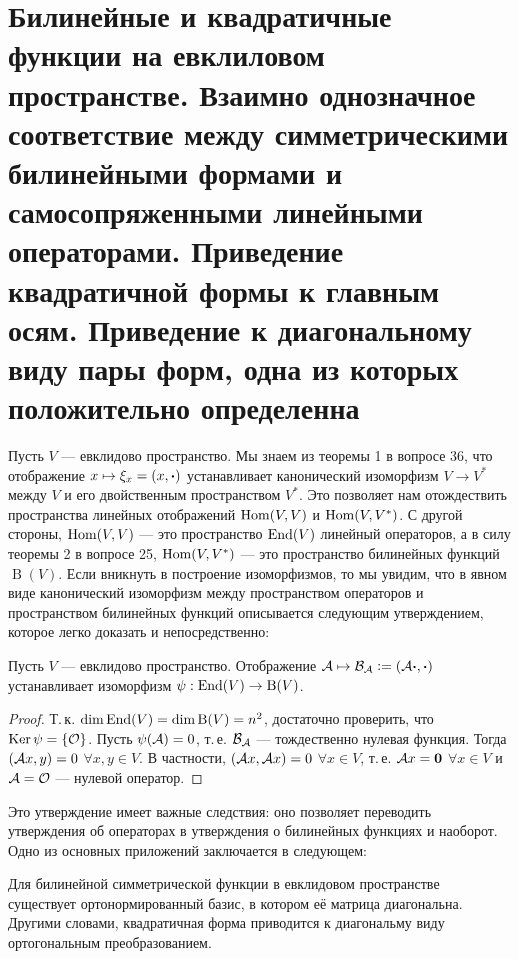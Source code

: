 \section{Билинейные и квадратичные функции на евклиловом пространстве. Взаимно однозначное
соответствие между симметрическими билинейными формами и самосопряженными
линейными операторами. Приведение квадратичной формы к главным осям. Приведение к
диагональному виду пары форм, одна из которых положительно определенна}

Пусть $V$ --- евклидово пространство. Мы знаем из теоремы 1 в вопросе 36, что отображение $x \mapsto \xi_x = (x, \boldsymbol{\cdot})$ устанавливает канонический изоморфизм $V \to V^\ast$ между $V$ и его двойственным пространством $V^\ast$. Это позволяет нам отождествить пространства линейных отображений $\operatorname{Hom}(V, V)$ и $\operatorname{Hom}(V, V^\ast)$. С другой стороны, $\operatorname{Hom}(V ,V)$ --- это пространство $\operatorname{End}(V)$ линейный операторов, а в силу теоремы 2 в вопросе 25, $\operatorname{Hom}(V, V^\ast)$ --- это пространство билинейных функций $\operatorname{B}(V)$. Если вникнуть в построение изоморфизмов, то мы увидим, что в явном виде канонический изоморфизм между пространством операторов и пространством билинейных функций описывается следующим утверждением, которое легко доказать и непосредственно:

\begin{proposal}
    Пусть $V$ --- евклидово пространство. Отображение $\mathcal{A} \mapsto \mathcal{B}_{\mathcal{A}} \vcentcolon = (\mathcal{A}\boldsymbol{\cdot}, \boldsymbol{\cdot})$ устанавливает изоморфизм $\psi: \operatorname{End}(V) \to \operatorname{B}(V)$.
\end{proposal}

\begin{proof}
    Т.\,к. $\dim\operatorname{End}(V) = \dim\operatorname{B}(V) = n^2$, достаточно проверить, что $\operatorname{Ker}\psi = \{\mathcal{O}\}$. Пусть $\psi(\mathcal{A}) = 0$, т.\,е. $\mathcal{B}_{\mathcal{A}}$ --- тождественно нулевая функция. Тогда $(\mathcal{A} x, y) = 0$ $\forall x, y \in V$. В частности, $(\mathcal{A} x, \mathcal{A} x) = 0$ $\forall x \in V$, т.\,е. $\mathcal{A} x = \boldsymbol{0}$ $\forall x \in V$ и $\mathcal{A} = \mathcal{O}$ --- нулевой оператор.
\end{proof}

Это утверждение имеет важные следствия: оно позволяет переводить утверждения об операторах в утверждения о билинейных функциях и наоборот. Одно из основных приложений заключается в следующем:

\begin{theorem}
    Для билинейной симметрической функции в евклидовом пространстве существует ортонормированный базис, в котором её матрица диагональна. Другими словами, квадратичная форма приводится к диагональму виду ортогональным преобразованием.
\end{theorem}

